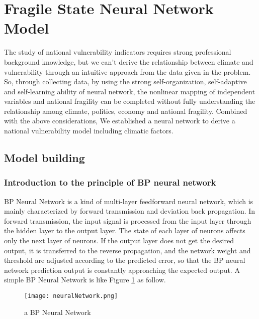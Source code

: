 \documentclass{mcmthesis}
\newcommand{\upcite}[1]{\textsuperscript{\textsuperscript{\cite{#1}}}}
\begin{document}





\section{Fragile State Neural Network Model}
The study of national vulnerability indicators requires strong professional
background knowledge, but we can't derive the relationship between climate
and vulnerability through an intuitive approach from the data given in the 
problem. So, through collecting data, by using the strong self-organization, 
self-adaptive and self-learning ability of neural network, the nonlinear 
mapping of independent variables and national fragility can be completed 
without fully understanding the relationship among climate, politics, 
economy and national fragility. Combined with the above considerations, 
We established a neural network to derive a national vulnerability model 
including climatic factors.
\subsection{Model building}
\subsubsection{Introduction to the principle of BP neural network}
BP Neural Network is a kind of multi-layer feedforward neural network, 
which is mainly characterized by forward transmission and deviation back 
propagation. In forward transmission, the input signal is processed from 
the input layer through the hidden layer to the output layer. The state of 
each layer of neurons affects only the next layer of neurons. If the output 
layer does not get the desired output, it is transferred to the reverse 
propagation, and the network weight and threshold are adjusted according 
to the predicted error, so that the BP neural network prediction output 
is constantly approaching the expected output. A simple BP Neural Network 
is like Figure \ref{fig:nn} as follow.\upcite{bib20}
\begin{figure}[h]
\small
\centering
\texttt{[image: neuralNetwork.png]}
\caption{a BP Neural Network} 
\label{fig:nn}
\end{figure}
\end{document}
